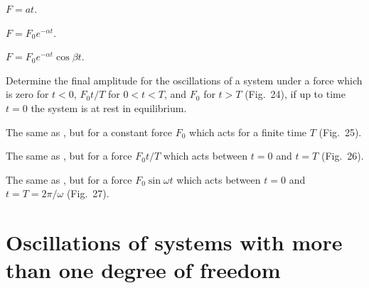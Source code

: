 \begin{subproblem}
{
$F = at$.
}
{}
{}
\end{subproblem}

\begin{subproblem}
{
$F = F_0 e^{-\alpha t}$.
}
{}
{}
\end{subproblem}

\begin{subproblem}
{
$F = F_0 e^{-\alpha t} \cos{\beta t}$.
}
{}
{}
\end{subproblem}


\begin{problem}[title={Final amplitude after a ramped-up force}]
{
Determine the final amplitude for the oscillations of a system under a force which is zero for $t < 0$, $F_0 t/T$ for $0 < t < T$, and $F_0$ for $t > T$ (Fig.~24), if up to time $t = 0$ the system is at rest in equilibrium.
}
{}
{}
\end{problem}


\begin{problem}[title={Final amplitude after a constant force pulse}]
{
The same as , but for a constant force $F_0$ which acts for a finite time $T$ (Fig.~25).
}
{}
{}
\end{problem}


\begin{problem}[title={Amplitude after a linearly growing force}]
{
The same as , but for a force $F_0 t/T$ which acts between $t = 0$ and $t = T$ (Fig.~26).
}
{}
{}
\end{problem}


\begin{problem}[title={Amplitude after one period of a sine force}]
{
The same as , but for a force $F_0 \sin{\omega t}$ which acts between $t = 0$ and $t = T = 2\pi/\omega$ (Fig.~27).
}
{}
{}
\end{problem}

\section{Oscillations of systems with more than one degree of freedom}

